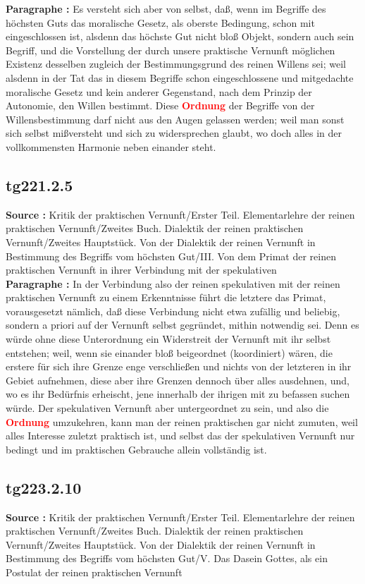 \documentclass[a4paper,12pt,twoside]{book}
\newcommand{\match}[1]{\textcolor{red}{\textbf{#1}}}
\begin{document}
	\noindent\textbf{Paragraphe : }Es versteht sich aber von selbst, daß, wenn im Begriffe des höchsten Guts das moralische Gesetz, als oberste Bedingung, schon mit eingeschlossen ist, alsdenn das höchste Gut nicht bloß Objekt, sondern auch sein Begriff, und die Vorstellung der durch unsere praktische Vernunft möglichen Existenz desselben zugleich der Bestimmungsgrund des reinen Willens sei; weil alsdenn in der Tat das in diesem Begriffe schon eingeschlossene und mitgedachte moralische Gesetz und kein anderer Gegenstand, nach dem Prinzip der Autonomie, den Willen bestimmt. Diese \match{Ordnung} der Begriffe von der Willensbestimmung darf nicht aus den Augen gelassen werden; weil man sonst sich selbst mißversteht und sich zu widersprechen glaubt, wo doch alles in der vollkommensten Harmonie neben einander steht. 
	
	\subsection*{tg221.2.5} 
	\textbf{Source : }Kritik der praktischen Vernunft/Erster Teil. Elementarlehre der reinen praktischen Vernunft/Zweites Buch. Dialektik der reinen praktischen Vernunft/Zweites Hauptstück. Von der Dialektik der reinen Vernunft in Bestimmung des Begriffs vom höchsten Gut/III. Von dem Primat der reinen praktischen Vernunft in ihrer Verbindung mit der spekulativen\\  
	
	\noindent\textbf{Paragraphe : }In der Verbindung also der reinen spekulativen mit der reinen praktischen Vernunft zu einem Erkenntnisse führt die letztere das Primat, vorausgesetzt nämlich, daß diese Verbindung nicht etwa zufällig und beliebig, sondern a priori auf der Vernunft selbst gegründet, mithin notwendig sei. Denn es würde ohne diese Unterordnung ein Widerstreit der Vernunft mit ihr selbst entstehen; weil, wenn sie einander bloß beigeordnet (koordiniert) wären, die erstere für sich ihre Grenze enge verschließen und nichts von der  letzteren in ihr Gebiet aufnehmen, diese aber ihre Grenzen dennoch über alles ausdehnen, und, wo es ihr Bedürfnis erheischt, jene innerhalb der ihrigen mit zu befassen suchen würde. Der spekulativen Vernunft aber untergeordnet zu sein, und also die \match{Ordnung} umzukehren, kann man der reinen praktischen gar nicht zumuten, weil alles Interesse zuletzt praktisch ist, und selbst das der spekulativen Vernunft nur bedingt und im praktischen Gebrauche allein vollständig ist. 
	
	\subsection*{tg223.2.10} 
	\textbf{Source : }Kritik der praktischen Vernunft/Erster Teil. Elementarlehre der reinen praktischen Vernunft/Zweites Buch. Dialektik der reinen praktischen Vernunft/Zweites Hauptstück. Von der Dialektik der reinen Vernunft in Bestimmung des Begriffs vom höchsten Gut/V. Das Dasein Gottes, als ein Postulat der reinen praktischen Vernunft\\  
	
\end{document}
